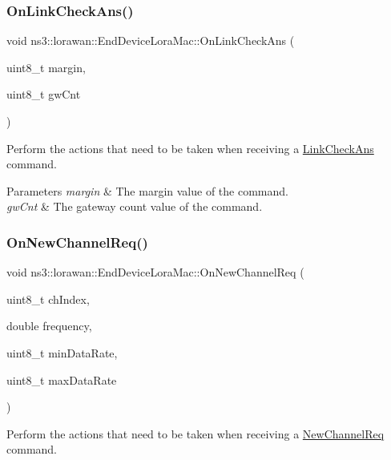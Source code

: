 \subsubsection{\texorpdfstring{On\+Link\+Check\+Ans()}{OnLinkCheckAns()}}
{\footnotesize\ttfamily void ns3\+::lorawan\+::\+End\+Device\+Lora\+Mac\+::\+On\+Link\+Check\+Ans (\begin{DoxyParamCaption}\item[{uint8\+\_\+t}]{margin,  }\item[{uint8\+\_\+t}]{gw\+Cnt }\end{DoxyParamCaption})}

Perform the actions that need to be taken when receiving a \hyperlink{classns3_1_1lorawan_1_1LinkCheckAns}{Link\+Check\+Ans} command.


\begin{DoxyParams}{Parameters}
{\em margin} & The margin value of the command. \\
\hline
{\em gw\+Cnt} & The gateway count value of the command. \\
\hline
\end{DoxyParams}
\mbox{\label{classns3_1_1lorawan_1_1EndDeviceLoraMac_a394c957d5dd4c8e35e431dd26d276995}} 
\subsubsection{\texorpdfstring{On\+New\+Channel\+Req()}{OnNewChannelReq()}}
{\footnotesize\ttfamily void ns3\+::lorawan\+::\+End\+Device\+Lora\+Mac\+::\+On\+New\+Channel\+Req (\begin{DoxyParamCaption}\item[{uint8\+\_\+t}]{ch\+Index,  }\item[{double}]{frequency,  }\item[{uint8\+\_\+t}]{min\+Data\+Rate,  }\item[{uint8\+\_\+t}]{max\+Data\+Rate }\end{DoxyParamCaption})}

Perform the actions that need to be taken when receiving a \hyperlink{classns3_1_1lorawan_1_1NewChannelReq}{New\+Channel\+Req} command. \mbox{\label{classns3_1_1lorawan_1_1EndDeviceLoraMac_abe423a1fb1a82c2264f362670197eb55}} 
